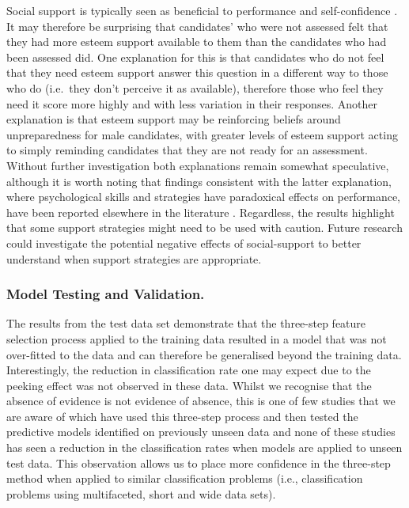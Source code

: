 \documentclass[
  12pt,
  a4paper,
]{book}
\begin{document}
Social support is typically seen as beneficial to performance and self-confidence \citep{Rees2007}. It may therefore be surprising that candidates' who were not assessed felt that they had more esteem support available to them than the candidates who had been assessed did. One explanation for this is that candidates who do not feel that they need esteem support answer this question in a different way to those who do (i.e.~they don't perceive it as available), therefore those who feel they need it score more highly and with less variation in their responses. Another explanation is that esteem support may be reinforcing beliefs around unpreparedness for male candidates, with greater levels of esteem support acting to simply reminding candidates that they are not ready for an assessment. Without further investigation both explanations remain somewhat speculative, although it is worth noting that findings consistent with the latter explanation, where psychological skills and strategies have paradoxical effects on performance, have been reported elsewhere in the literature \citep{Roberts2013}. Regardless, the results highlight that some support strategies might need to be used with caution. Future research could investigate the potential negative effects of social-support to better understand when support strategies are appropriate.

\hypertarget{model-testing-and-validation.-2}{%
\subsubsection{Model Testing and Validation.}\label{model-testing-and-validation.-2}}

The results from the test data set demonstrate that the three-step feature selection process applied to the training data resulted in a model that was not over-fitted to the data and can therefore be generalised beyond the training data. Interestingly, the reduction in classification rate one may expect due to the peeking effect \citep{Kuncheva2018, Reunanen2003a} was not observed in these data. Whilst we recognise that the absence of evidence is not evidence of absence, this is one of few studies that we are aware of which have used this three-step process and then tested the predictive models identified on previously unseen data \citep[see][]{Jones2019b, Jones2020} and none of these studies has seen a reduction in the classification rates when models are applied to unseen test data. This observation allows us to place more confidence in the three-step method when applied to similar classification problems (i.e., classification problems using multifaceted, short and wide data sets).
\end{document}
